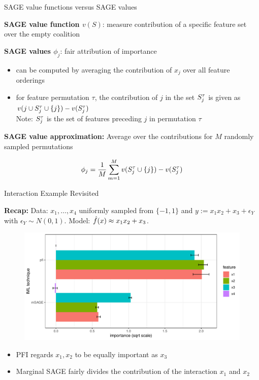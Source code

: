 \documentclass[11pt,compress,t,notes=noshow, aspectratio=169, xcolor=table]{beamer}
\begin{document}
\begin{frame}{SAGE value functions versus SAGE values}

\textbf{SAGE value function $v(S)$}: measure contribution of a specific feature set over the empty coalition

\lz\pause

\textbf{SAGE values $\phi_j$}: fair attribution of importance
\begin{itemize}
    \item can be computed by averaging the contribution of $x_j$ over all feature orderings
    \item for feature permutation $\tau$, the contribution of $j$ in the set $\Stau$ is given as $v(j \cup \Stauj) - v(\Stau)$\\
    Note: $\Stau$ is the set of features preceding $j$ in permutation $\tau$
\end{itemize}

\lz\pause

\textbf{SAGE value approximation:} Average over the contributions for $M$ randomly sampled permutations

\begin{align*}
    \phi_j = \frac{1}{M} \sum_{m=1}^M v(\Stauj) - v(\Stau)
\end{align*}
    
\end{frame}

\begin{frame}{Interaction Example Revisited}

\textbf{Recap:} Data: $x_1, \dots, x_4$ uniformly sampled from $\{-1, 1\}$ and $y:= x_1 x_2 + x_3 + \epsilon_Y$ with $\epsilon_Y \sim N(0, 1)$. Model: $\fh(x) \approx x_1 x_2 + x_3$.\\
%
\begin{figure}
  \includegraphics[width=0.65\linewidth]{figure_man/sage_pfi_interactions}
\end{figure}
%
\begin{itemize}
    \item PFI regards $x_1, x_2$ to be equally important as $x_3$
    \item Marginal SAGE fairly divides the contribution of the interaction $x_1$ and $x_2$
\end{itemize}

\end{frame}
\end{document}

